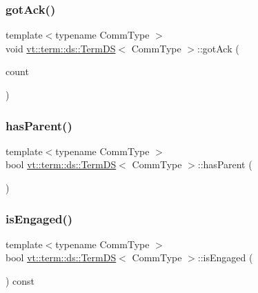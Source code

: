 \mbox{\label{structvt_1_1term_1_1ds_1_1_term_d_s_a6fcd87a189c046c48c341f39f9ea0b69}} 
\subsubsection{\texorpdfstring{got\+Ack()}{gotAck()}}
{\footnotesize\ttfamily template$<$typename Comm\+Type $>$ \\
void \hyperlink{structvt_1_1term_1_1ds_1_1_term_d_s}{vt\+::term\+::ds\+::\+Term\+DS}$<$ Comm\+Type $>$\+::got\+Ack (\begin{DoxyParamCaption}\item[{\hyperlink{structvt_1_1term_1_1ds_1_1_term_d_s_a54f4ebd7e1ecb59c32c0f5b03ef9f20b}{Count\+Type}}]{count }\end{DoxyParamCaption})}

\mbox{\label{structvt_1_1term_1_1ds_1_1_term_d_s_a5d112306bb319f8d5f542a104ccb87a6}} 
\subsubsection{\texorpdfstring{has\+Parent()}{hasParent()}}
{\footnotesize\ttfamily template$<$typename Comm\+Type $>$ \\
bool \hyperlink{structvt_1_1term_1_1ds_1_1_term_d_s}{vt\+::term\+::ds\+::\+Term\+DS}$<$ Comm\+Type $>$\+::has\+Parent (\begin{DoxyParamCaption}{ }\end{DoxyParamCaption})}

\mbox{\label{structvt_1_1term_1_1ds_1_1_term_d_s_a5587da947484c81472ff0a4563a2efb4}} 
\subsubsection{\texorpdfstring{is\+Engaged()}{isEngaged()}}
{\footnotesize\ttfamily template$<$typename Comm\+Type $>$ \\
bool \hyperlink{structvt_1_1term_1_1ds_1_1_term_d_s}{vt\+::term\+::ds\+::\+Term\+DS}$<$ Comm\+Type $>$\+::is\+Engaged (\begin{DoxyParamCaption}{ }\end{DoxyParamCaption}) const\hspace{0.3cm}{\ttfamily [inline]}}

